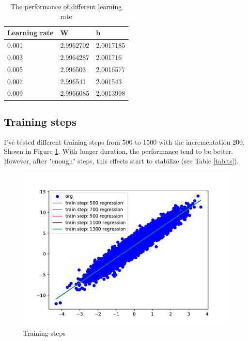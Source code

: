 \documentclass{article}
\begin{document}
\begin{table}
  \caption{The performance of different learning rate}
  \label{tab:lr}
  \centering
  \begin{tabular}{lll}
    \toprule
    Learning rate     & W     & b \\
    \midrule
    0.001 & 2.9962702  & 2.0017185     \\
    0.003     & 2.9964287 & 2.001716     \\
    0.005     & 2.996503       & 2.0016577  \\
    0.007     & 2.996541 & 2.001543      \\
    0.009     & 2.9966085      & 2.0013998  \\
    \bottomrule
  \end{tabular}
\end{table}

\subsection{Training steps}
I've tested different training steps from 500 to 1500 with the incrementation 200. Shown in Figure \ref{ts}. With longer duration, the performance tend to be better. However, after "enough" steps, this effects start to stabilize (see Table \ref{tab:ts}).


\begin{figure}[!h]
  \centering
  \includegraphics[scale=0.5]{imgs/ts.pdf}
  \caption{Training steps}
  \label{ts}
\end{figure}
\end{document}
